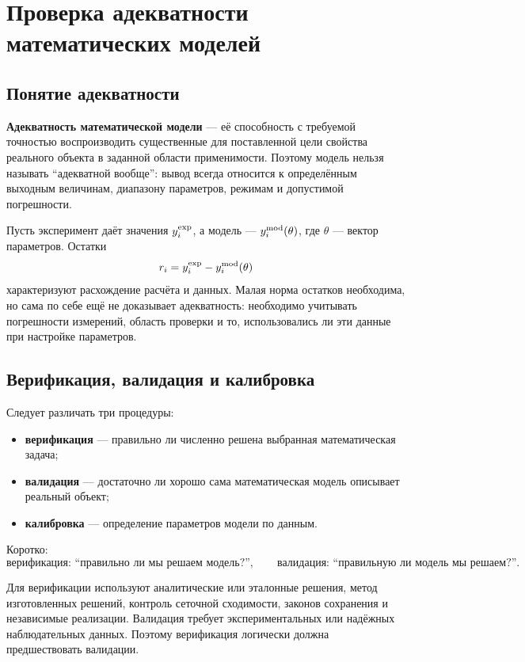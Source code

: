 \section{Проверка адекватности математических моделей}
\label{sec:model-adequacy-verification}

\subsection{Понятие адекватности}

\textbf{Адекватность математической модели} --- её способность с требуемой
точностью воспроизводить существенные для поставленной цели свойства реального
объекта в заданной области применимости. Поэтому модель нельзя называть
``адекватной вообще'': вывод всегда относится к определённым выходным величинам,
диапазону параметров, режимам и допустимой погрешности.

Пусть эксперимент даёт значения $y_i^{\rm exp}$, а модель ---
$y_i^{\rm mod}(\theta)$, где $\theta$ --- вектор параметров. Остатки
\[
    r_i=y_i^{\rm exp}-y_i^{\rm mod}(\theta)
\]
характеризуют расхождение расчёта и данных. Малая норма остатков необходима,
но сама по себе ещё не доказывает адекватность: необходимо учитывать погрешности
измерений, область проверки и то, использовались ли эти данные при настройке
параметров.

\subsection{Верификация, валидация и калибровка}

Следует различать три процедуры:
\begin{itemize}
    \item \textbf{верификация} --- правильно ли численно решена выбранная
    математическая задача;
    \item \textbf{валидация} --- достаточно ли хорошо сама математическая
    модель описывает реальный объект;
    \item \textbf{калибровка} --- определение параметров модели по данным.
\end{itemize}

Коротко:
\[
\boxed{\text{верификация: ``правильно ли мы решаем модель?''}},
\qquad
\boxed{\text{валидация: ``правильную ли модель мы решаем?''}}.
\]

Для верификации используют аналитические или эталонные решения, метод
изготовленных решений, контроль сеточной сходимости, законов сохранения и
независимые реализации. Валидация требует экспериментальных или надёжных
наблюдательных данных. Поэтому верификация логически должна предшествовать
валидации.

